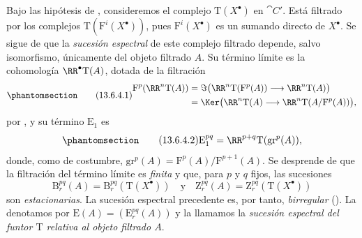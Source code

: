 \documentclass[oneside]{amsart}
\newcommand{\oldpage}[2][]{{\marginnote{\normalfont\textbf{#1}~|~#2}}\ignorespaces}
\let\EGAOriginalLabel\label
\renewcommand{\label}[1]{\phantomsection\EGAOriginalLabel{#1}}
\begin{document}
\begin{env}[13.6.4]
\label{0.13.6.4}
Bajo las hipótesis de , consideremos el complejo
$\mathrm{T}(X^\bullet)$ en $\cat{C}'$.
Está filtrado por los complejos
$\mathrm{T}(\mathrm{F}^i(X^\bullet))$, pues
$\mathrm{F}^i(X^\bullet)$ es un sumando directo de $X^\bullet$.
Se sigue de  que la \emph{sucesión espectral} de
este complejo filtrado depende, salvo isomorfismo, únicamente del
objeto filtrado $A$.
Su término límite es la cohomología $\RR^\bullet\mathrm{T}(A)$, dotada
de la filtración
\begin{equation}
\label{0.13.6.4.1}
\tag{13.6.4.1}
  \begin{split}
  \mathrm{F}^p(\RR^n\mathrm{T}(A))
  &=
  \Im\bigl(
    \RR^n\mathrm{T}(\mathrm{F}^p(A))
    \longrightarrow
    \RR^n\mathrm{T}(A)
  \bigr)
  \\
  &=
  \Ker\bigl(
    \RR^n\mathrm{T}(A)
    \longrightarrow
    \RR^n\mathrm{T}(A/\mathrm{F}^p(A))
  \bigr),
  \end{split}
\end{equation}
por , y su término $\mathrm{E}_1$ es
\begin{equation}
\label{0.13.6.4.2}
\tag{13.6.4.2}
  \mathrm{E}_1^{pq}
  =
  \RR^{p+q}\mathrm{T}(\mathrm{gr}^p(A)),
\end{equation}
donde, como de costumbre,
$\mathrm{gr}^p(A)=\mathrm{F}^p(A)/\mathrm{F}^{p+1}(A)$.
Se desprende de  que la filtración del término límite
es \emph{finita} y que, para $p$ y $q$ fijos, las sucesiones
\oldpage[0\textsubscript{III}]{74}
\[
  \mathrm{B}_r^{pq}(A)
  =
  \mathrm{B}_r^{pq}(\mathrm{T}(X^\bullet))
  \quad\text{y}\quad
  \mathrm{Z}_r^{pq}(A)
  =
  \mathrm{Z}_r^{pq}(\mathrm{T}(X^\bullet))
\]
son \emph{estacionarias}.
La sucesión espectral precedente es, por tanto, \emph{birregular}
().
La denotamos por
$\mathrm{E}(A)=(\mathrm{E}_r^{pq}(A))$ y la llamamos la
\emph{sucesión espectral del funtor $\mathrm{T}$ relativa al
objeto filtrado $A$}.
\end{env}
\end{document}
